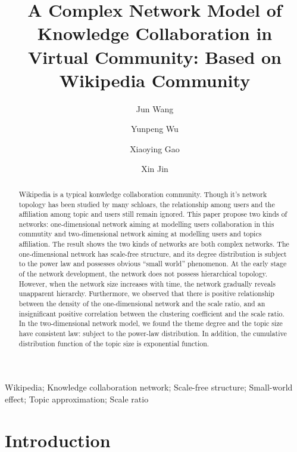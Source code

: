 \documentclass{elsarticle}
\begin{document}
\begin{frontmatter}
\title{A Complex Network Model of Knowledge Collaboration in Virtual Community: Based on Wikipedia Community
}
\author[buaa]{Jun Wang }
\author[buaa]{Yunpeng Wu}

\author[buaa]{Xiaoying Gao}

\author[buaa]{Xin Jin}

\address[buaa]{School of Economics and Management, Beihang University, 
Beijing 100083, P.R. China}

\begin{abstract}
  Wikipedia is a typical konwledge collaboration community. Though
  it's network topology has been studied by many schloars, the
  relationship among users and the affiliation among topic and users 
  still remain ignored. This paper propose two kinds of networks:
one-dimensional network aiming at modelling users collaboration in
this commutity and
two-dimensional network aiming at modelling users and topics
affiliation. The result shows the two kinds of networks are both
complex networks.  The one-dimensional network has scale-free
structure, and its degree distribution is subject to the power law and
possesses obvious “small world” phenomenon. At the early stage of the
network development, the network does not possess hierarchical
topology. However, when the network size increases with time, the
network gradually reveals unapparent hierarchy. Furthermore, we
observed that there is positive relationship between the density of
the one-dimensional network and the scale ratio, and  an
insignificant positive correlation between the clustering coefficient
and the scale ratio. In the two-dimensional network model, we found
the theme degree and the topic size have consistent law: subject to
the power-law distribution. In addition, the cumulative distribution function of the topic size is exponential function.


\end{abstract}

\begin{keyword}
Wikipedia; Knowledge collaboration network; Scale-free structure;
Small-world effect; Topic approximation; Scale ratio
  
\end{keyword}
\end{frontmatter}

\section{Introduction}
\label{sec:introduction}
\end{document}
